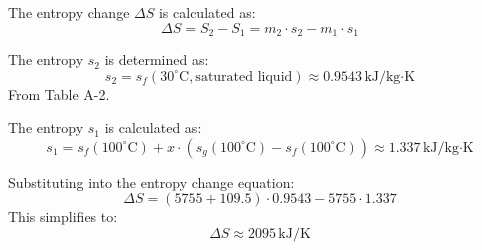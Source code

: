 The entropy change \( \Delta S \) is calculated as:  
\[
\Delta S = S_2 - S_1 = m_2 \cdot s_2 - m_1 \cdot s_1
\]  

The entropy \( s_2 \) is determined as:  
\[
s_2 = s_f(30^\circ\text{C}, \text{saturated liquid}) \approx 0.9543 \, \text{kJ/kg·K}
\]  
From Table A-2.  

The entropy \( s_1 \) is calculated as:  
\[
s_1 = s_f(100^\circ\text{C}) + x \cdot \left(s_g(100^\circ\text{C}) - s_f(100^\circ\text{C})\right) \approx 1.337 \, \text{kJ/kg·K}
\]  

Substituting into the entropy change equation:  
\[
\Delta S = (5755 + 109.5) \cdot 0.9543 - 5755 \cdot 1.337
\]  
This simplifies to:  
\[
\Delta S \approx 2095 \, \text{kJ/K}
\]